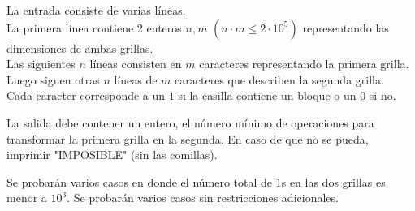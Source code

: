 \documentclass{oci}
\begin{document}
\begin{inputDescription}
La entrada consiste de varias líneas.\\
La primera línea contiene 2 enteros $n, m$ $(n \cdot m \leq 2 \cdot 10^5)$ representando las dimensiones de ambas grillas.\\

Las siguientes $n$ líneas consisten en $m$ caracteres representando la primera grilla.\\

Luego siguen otras $n$ líneas de $m$ caracteres que describen la segunda grilla.\\

Cada caracter corresponde a un $1$ si la casilla contiene un bloque o un $0$ si no.
\end{inputDescription}

\begin{outputDescription}
La salida debe contener un entero, el número mínimo de operaciones para transformar la primera grilla en la segunda. En caso de que no se pueda, imprimir "IMPOSIBLE" (sin las comillas).
\end{outputDescription}

\begin{scoreDescription}
  Se probarán varios casos en donde el número total de $1$s en las dos grillas es menor a $10^3$.
  Se probarán varios casos sin restricciones adicionales.
\end{scoreDescription}

\begin{sampleDescription}
\end{sampleDescription}
\end{document}
